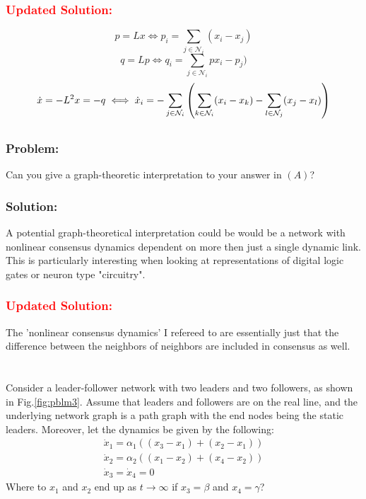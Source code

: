 \documentclass[]{article}
\numberwithin{equation}{section}
\renewcommand{\figurename}{Fig.}
\begin{document}
\subsubsection*{\textcolor{red}{Updated Solution:}}
\[
    p = L x \iff p_i = \sum_{j \in \mathcal{N}_i} (x_i - x_j)
\]\[
    q = L p \iff q_i = \sum_{j \in \mathcal{N}_i} px_i - p_j)
\]\[
    \dot{x} = - L^2 x = - q 
        \iff \dot{x}_i = - \sum_{j \in \mathcal{N}_i} \qty(
            \sum_{k \in \mathcal{N}_i} (x_i - x_k)
            - \sum_{l \in \mathcal{N}_j} (x_j - x_l)
        )
\]

\subsection{}
\subsubsection*{Problem:}
Can you give a graph-theoretic interpretation to your answer in $(A)$?


\subsubsection*{Solution:}
A potential graph-theoretical interpretation could be would be a network with nonlinear consensus dynamics dependent on more then just a single dynamic link. 
This is particularly interesting when looking at representations of digital logic gates or neuron type "circuitry".

\subsubsection*{\textcolor{red}{Updated Solution:}}
The 'nonlinear consensus dynamics' I refereed to are essentially just that the difference between the neighbors of neighbors are included in consensus as well.


\newpage
\section{}
Consider a leader-follower network with two leaders and two followers, as shown in \figurename \ref{fig:pblm3}. 
Assume that leaders and followers are on the real line, and the underlying network graph is a path graph with the end nodes being the static leaders.
Moreover, let the dynamics be given by the following:
\begin{gather*}
    \dot{x}_1 = \alpha_1((x_3-x_1) + (x_2 - x_1))\\
    \dot{x}_2 = \alpha_2((x_1-x_2) + (x_4 - x_2))\\
    \dot{x}_3 = \dot{x}_4 = 0
\end{gather*}
Where to $x_1$ and $x_2$ end up as $t \to \infty$ if $x_3 = \beta$ and $x_4 = \gamma$?
\end{document}
